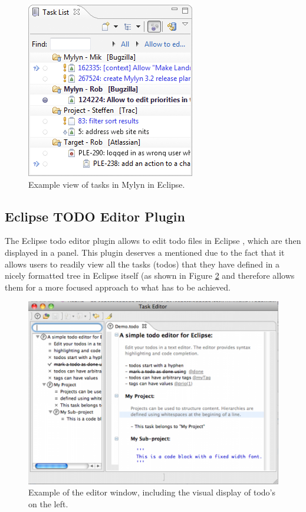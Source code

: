 \documentclass{4thYearProject}
\begin{document}
\begin{figure}[H]
\includegraphics[scale=0.7]{Mylyn}
\centering
\caption{Example view of tasks in Mylyn in Eclipse.}
\label{fig:mylyn}
\end{figure}

\subsection{Eclipse TODO Editor Plugin}

The Eclipse todo editor plugin allows to edit todo files in Eclipse \cite{todoeditor}, which are then displayed in a panel. This plugin deserves a mentioned due to the fact that it allows users to readily view all the tasks (todos) that they have defined in a nicely formatted tree in Eclipse itself (as shown in Figure \ref{fig:eclipsetodo} and therefore allows them for a more focused approach to what has to be achieved. 

\begin{figure}[H]
\includegraphics[scale=0.6]{eclipse_TODO_editor}
\centering
\caption{Example of the editor window, including the visual display of todo's on the left.}\label{eclipsetodo}
\label{fig:eclipsetodo}
\end{figure}
\end{document}
